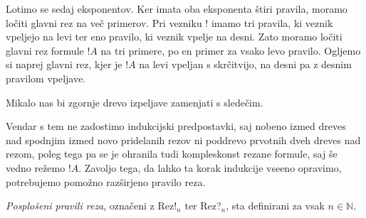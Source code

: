 Lotimo se sedaj eksponentov. Ker imata oba eksponenta štiri pravila, moramo ločiti glavni rez na več primerov. Pri vezniku ! imamo tri pravila, ki veznik vpeljejo na levi ter eno pravilo, ki veznik vpelje na desni. Zato moramo ločiti glavni rez formule $!A$ na tri primere, po en primer za vsako levo pravilo. Ogljemo si naprej glavni rez, kjer je $!A$ na levi vpeljan s skrčitvijo, na desni pa z desnim pravilom vpeljave.
\begin{prooftree}


\end{prooftree}
Mikalo nas bi zgornje drevo izpeljave zamenjati s sledečim.
\begin{prooftree}




\end{prooftree}
Vendar s tem ne zadostimo indukcijski predpostavki, saj nobeno izmed dreves nad spodnjim izmed novo pridelanih rezov ni poddrevo prvotnih dveh dreves nad rezom, poleg tega pa se je ohranila tudi kompleskonst rezane formule, saj še vedno režemo $!A$. Zavoljo tega, da lahko ta korak indukcije vseeno opravimo, potrebujemo pomožno razširjeno pravilo reza.
\begin{definicija}
    \emph{Posplošeni pravili reza}, označeni z Rez!$_n$ ter Rez?$_{n}$, sta definirani za vsak $n \in \mathbb{N}$.
    \begin{prooftree}
    \end{prooftree}
    \begin{prooftree}
    \end{prooftree}
\end{definicija}

